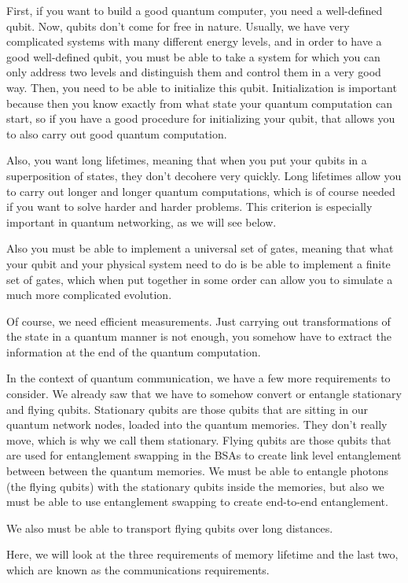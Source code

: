 First, if you want to build a good quantum computer, you need a well-defined qubit. Now, qubits don't come for free in nature. Usually, we have very complicated systems with many different energy levels, and in order to have a good well-defined qubit, you must be able to take a system for which you can only address two levels and distinguish them and control them in a very good way. Then, you need to be able to initialize this qubit. Initialization is important because then you know exactly from what state your quantum computation can start, so if you have a good procedure for initializing your qubit, that allows you to also carry out good quantum computation.

Also, you want long lifetimes, meaning that when you put your qubits in a superposition of states, they don't decohere very quickly. Long lifetimes allow you to carry out longer and longer quantum computations, which is of course needed if you want to solve harder and harder problems.  This criterion is especially important in quantum networking, as we will see below.

Also you must be able to implement a universal set of gates, meaning that what your qubit and your physical system need to do is be able to implement a finite set of gates, which when put together in some order can allow you to simulate a much more complicated evolution.

Of course, we need efficient measurements. Just carrying out transformations of the state in a quantum manner is not enough, you somehow have to extract the information at the end of the quantum computation.

In the context of quantum communication, we have a few more requirements to consider. We already saw that we have to somehow convert or entangle stationary and flying qubits. Stationary qubits are those qubits that are sitting in our quantum network nodes, loaded into the quantum memories. They don't really move, which is why we call them stationary. Flying qubits are those qubits that are used for entanglement swapping in the BSAs to create link level entanglement between between the quantum memories. We must be able to entangle photons (the flying qubits) with the stationary qubits inside the memories, but also we must be able to use entanglement swapping to create end-to-end entanglement.

We also must be able to transport flying qubits over long distances.

Here, we will look at the three requirements of memory lifetime and the last two, which are known as the communications requirements.

